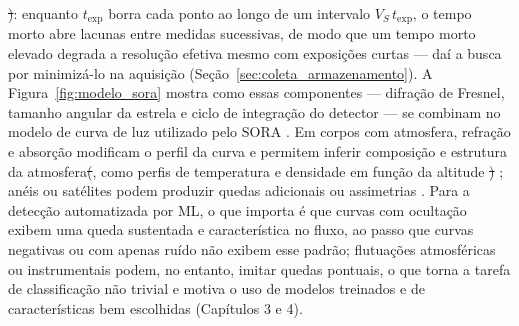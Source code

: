 \documentclass[msc]{on} %
\makeatletter
\providecommand{\DIFaddtex}[1]{{\protect\color{red}#1}} %
\providecommand{\DIFdeltex}[1]{{\protect\color{red}\sout{#1}}} %
\providecommand{\DIFaddbegin}{} %
\providecommand{\DIFaddend}{} %
\providecommand{\DIFdelbegin}{} %
\providecommand{\DIFdelend}{} %
\providecommand{\DIFadd}[1]{\texorpdfstring{\DIFaddtex{#1}}{#1}} %
\providecommand{\DIFdel}[1]{\texorpdfstring{\DIFdeltex{#1}}{}} %
\let\sout@orig\sout %
\renewcommand{\sout}[1]{\ifmmode\text{\sout@orig{\ensuremath{#1}}}\else\sout@orig{#1}\fi} %
\makeatother
\begin{document}
\DIFdel{)}\DIFdelend : enquanto \(t_{\mathrm{exp}}\) borra cada ponto ao longo de um intervalo \(V_S\,t_{\mathrm{exp}}\), o tempo morto abre lacunas entre medidas sucessivas, de modo que um tempo morto elevado degrada a resolução efetiva mesmo com exposições curtas --- daí a busca por minimizá-lo na aquisição (Seção~\ref{sec:coleta_armazenamento}). A Figura~\ref{fig:modelo_sora} mostra como essas componentes --- difração de Fresnel, tamanho angular da estrela e ciclo de integração do detector --- se combinam no modelo de curva de luz utilizado pelo SORA \citep{SORA2022}. Em corpos com atmosfera, refração e absorção modificam o perfil da curva e permitem inferir composição e estrutura da atmosfera\DIFdelbegin \DIFdel{(}\DIFdelend\ifhmode\hskip0pt\fi \DIFaddbegin \DIFadd{, como }\DIFaddend perfis de temperatura e densidade em função da altitude \DIFdelbegin \DIFdel{) }\DIFdelend \citep{Sicardy2016}; anéis ou satélites podem produzir quedas adicionais ou assimetrias \citep{BragaRibas2014}. Para a detecção automatizada por ML, o que importa é que curvas com ocultação exibem uma queda sustentada e característica no fluxo, ao passo que curvas negativas ou com apenas ruído não exibem esse padrão; flutuações atmosféricas ou instrumentais podem, no entanto, imitar quedas pontuais, o que torna a tarefa de classificação não trivial e motiva o uso de modelos treinados e de características bem escolhidas (Capítulos 3 e 4).
\end{document}
